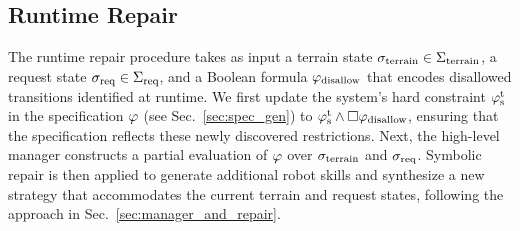 \subsection{Runtime Repair}\label{sec:online_repair}
The runtime repair procedure takes as input a terrain state $\sigma_{\textrm{terrain}} \in \Sigma_{\textrm{terrain}}$, a request state $\sigma_{\textrm{req}} \in \Sigma_{\textrm{req}}$, and a Boolean formula $\varphi_\textrm{disallow}$ that encodes disallowed transitions identified at runtime. We first update the system’s hard constraint $\varphi_\textrm{s}^\textrm{t}$ in the specification $\varphi$ (see Sec.~\ref{sec:spec_gen}) to $\varphi_\textrm{s}^\textrm{t} \land \square \varphi_\textrm{disallow}$, ensuring that the specification reflects these newly discovered restrictions. Next, the high-level manager constructs a partial evaluation of $\varphi$ over $\sigma_{\textrm{terrain}}$ and $\sigma_{\textrm{req}}$. Symbolic repair is then applied to generate additional robot skills and synthesize a new strategy that accommodates the current terrain and request states, following the approach in Sec.~\ref{sec:manager_and_repair}.







